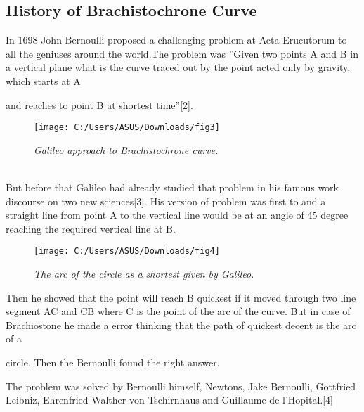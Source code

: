 \documentclass[10pt,a4paper]{article}
\begin{document}
\begin{flushleft}
	\subsection{History of Brachistochrone Curve}
	In 1698 John Bernoulli proposed a challenging problem at Acta Erucutorum to all the
	geniuses around the world.The problem was ”Given two points A and B in a vertical
	plane what is the curve traced out by the point acted only by gravity, which starts at A
	
	and reaches to point B at shortest time”[2].
	\begin{figure}[h]
		\centering
		\texttt{[image: C:/Users/ASUS/Downloads/fig3]}
		\caption{\textit{Galileo approach to Brachistochrone curve.}}

	\end{figure}
    \\
    But before that Galileo had already studied that problem in his famous work discourse
    on two new sciences[3]. His version of problem was first to and a straight line from point
    A to the vertical line would be at an angle of 45 degree reaching the required vertical line at B.
    
    \begin{figure}[h]
    	\centering
    	\texttt{[image: C:/Users/ASUS/Downloads/fig4]}
    	\caption{\textit{The arc of the circle as a shortest given by Galileo.}}
    	
    \end{figure}
    \newpage 
    Then he showed that the point will reach B quickest if it moved through two line
    segment AC and CB where C is the point of the arc of the curve. But in case of
    Brachiostone he made a error thinking that the path of quickest decent is the arc of a
    
    circle. Then the Bernoulli found the right answer.
    
    The problem was solved by Bernoulli himself, Newtons, Jake Bernoulli, Gottfried
    Leibniz, Ehrenfried Walther von Tschirnhaus and Guillaume de l’Hopital.[4]
    

\end{flushleft}
\end{document}

